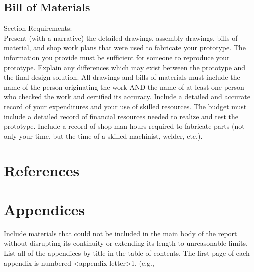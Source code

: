\documentclass[12pt,a4paper]{report}
\begin{document}
\subsection{Bill of Materials}
Section Requirements:\\
Present (with a narrative) the detailed drawings, assembly drawings, bills of material, and shop work plans that were used to fabricate your prototype.  The information you provide must be sufficient for someone to reproduce your prototype.  Explain any differences which may exist between the prototype and the final design solution.
All drawings and bills of materials must include the name of the person originating the work AND the name of at least one person who checked the work and certified its accuracy.
Include a detailed and accurate record of your expenditures and your use of skilled resources.  The budget must include a detailed record of financial resources needed to realize and test the prototype.  Include a record of shop man-hours required to fabricate parts (not only your time, but the time of a skilled machinist, welder, etc.).

\setcounter{section}{8}
\section{References}
\begingroup
   \def\chapter*#1{}
   
	
\endgroup	

 

\section{Appendices}
Include materials that could not be included in the main body of the report without disrupting its continuity or extending its length to unreasonable limits.  List all of the appendices by title in the table of contents.  
%
The first page of each appendix is numbered <appendix letter>1, (e.g., 
%
\end{document}
